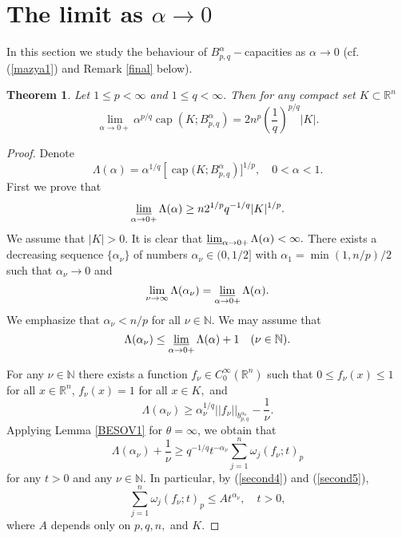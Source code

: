 \documentclass[12pt,twoside,reqno]{amsart}
\numberwithin{equation}{section}
\newtheorem{teo}{Theorem}[section]
\theoremstyle{definition}
\numberwithin{equation}{section}
\begin{document}
\section{The limit as ${\alpha}\to 0$}

In this section we study the behaviour of $B_{p,q}^{\alpha}-$capacities as
${\alpha}\to 0$ (cf.  (\ref{mazya1}) and Remark \ref{final} below).
\begin{teo}\label{SECOND} Let $1\le p<\infty$ and $1\le q<\infty.$ Then for any compact set $K\subset {\mathbb{R}}^n$
\begin{equation}\label{second0}
\lim_{{\alpha}\to 0+}{\alpha}^{p/q}{\operatorname{cap}} (K;B_{p,q}^{\alpha})=2n^p\left(\frac1q\right)^{p/q}|K|.
\end{equation}
\end{teo}
\begin{proof} Denote
\begin{equation*}
\Lambda({\alpha})={\alpha}^{1/q}\left[{\operatorname{cap}}(K; B_{p,q}^{\alpha}\right)]^{1/p},\quad 0<{\alpha}<1.
\end{equation*}
 First we prove that
\begin{equation}\label{second00}
\varliminf_{{\alpha}\to 0+}\Lambda({\alpha})\ge n2^{1/p}q^{-1/q}|K|^{1/p}.
\end{equation}
We assume that $|K|>0.$  It is clear that $\varliminf_{{\alpha}\to
0+}\Lambda({\alpha})<\infty.$ There exists a decreasing sequence
$\{{\alpha}_\nu\}$ of numbers ${\alpha}_\nu\in (0,1/2]$  with ${\alpha}_1=\min(1,
n/p)/2$ such that ${\alpha}_\nu\to 0$ and
\begin{equation}\label{second3}
\lim_{\nu\to\infty} \Lambda({\alpha}_\nu)=\varliminf_{{\alpha}\to 0+}\Lambda({\alpha}).
\end{equation}
We emphasize that  ${\alpha}_\nu<n/p$ for all $\nu\in {\mathbb{N}}.$ We may assume
that
\begin{equation}\label{second4}
\Lambda({\alpha}_\nu)\le \varliminf_{{\alpha}\to 0+}\Lambda({\alpha})+1 \quad (\nu\in {\mathbb{N}}).
\end{equation}

 For any $\nu\in {\mathbb{N}}$ there exists a function $f_\nu\in
C_0^\infty({\mathbb{R}}^n)$ such that $0\le f_\nu(x)\le 1$ for all $x\in
{\mathbb{R}}^n$, $f_\nu(x)=1$ for all $x\in K,$ and
$$
\Lambda({\alpha}_\nu)\ge {\alpha}_\nu^{1/q}||f_\nu||_{b_{p,q}^{{\alpha}_\nu}}-\frac1{\nu}.
$$
Applying Lemma \ref{BESOV1} for $\theta=\infty$, we obtain that
\begin{equation}\label{second5}
\Lambda({\alpha}_\nu)+\frac1{\nu}\ge q^{-1/q} t^{-{\alpha}_\nu}\sum_{j=1}^n{\omega}_j(f_\nu;t)_p
\end{equation}
for any $t>0$ and any $\nu\in {\mathbb{N}}.$ In particular, by (\ref{second4})
and (\ref{second5}),
\begin{equation}\label{second6}
\sum_{j=1}^n{\omega}_j(f_\nu;t)_p\le At^{{\alpha}_\nu}, \quad t>0,
\end{equation}
where $A$ depends only on $p, q, n,$ and $K.$


\end{proof}
\end{document}
